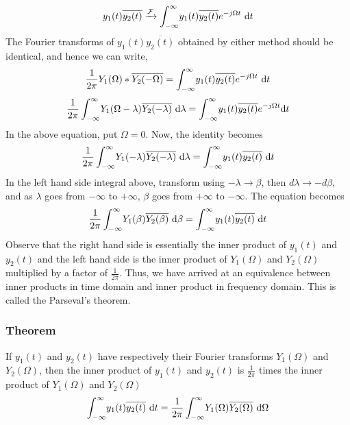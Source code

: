 		\begin{equation*}
			y_1(t)\overline{y_2(t)} \xrightarrow{\mathcal{F}} \int_{-\infty}^{\infty} \! y_1(t) \overline{y_2(t)} e^{-j\Omega t} \ \mathrm{d} t
		\end{equation*}
		The Fourier transforms of $y_1(t)\overline{y_2(t)}$  obtained by either method should be identical, and hence we can write,
		\begin{equation*}
			\frac{1}{2\pi} Y_1(\Omega) \ast \overline{Y_2(-\Omega)} = \int_{-\infty}^{\infty} \! y_1(t)\overline{y_2(t)} e^{-j\Omega t} \ \mathrm{d} t
		\end{equation*}
		\begin{equation*}
			\frac{1}{2\pi} \int_{-\infty}^{\infty} \! Y_1(\Omega - \lambda)\overline{Y_2(-\lambda)} \ \mathrm{d} \lambda 
			= 
			\int_{-\infty}^{\infty} \! y_1(t)\overline{y_2(t)} e^{-j\Omega t} \mathrm{d} t
		\end{equation*}
		In the above equation, put $\Omega  =0$. Now, the identity becomes
		\begin{equation*}
			\frac{1}{2\pi} \int_{-\infty}^{\infty} \! Y_1(-\lambda)\overline{Y_2(-\lambda)} \ \mathrm{d} \lambda
			= 
			\int_{-\infty}^{\infty} \! y_1(t)\overline{y_2(t)} \ \mathrm{d} t
		\end{equation*}
		In the left hand side integral above, transform using $-\lambda \rightarrow \beta$, then
		$d\lambda \rightarrow -d\beta$, and as $\lambda$ goes from $-\infty$ to $+\infty$, $\beta$ goes from $+\infty$ to $-\infty$. 
		The equation becomes
		\begin{equation*}
			\frac{1}{2\pi} \int_{-\infty}^{\infty} \!  Y_1(\beta) \overline{Y_2(\beta)} \ \mathrm{d} \beta 
			=
			\int_{-\infty}^{\infty} \! y_1(t) \overline{y_2(t)} \ \mathrm{d} t 
		\end{equation*}
		Observe that the right hand side is essentially the inner product of $y_1(t)$ and $y_2(t)$  and the left hand side is the inner product of $Y_1(\Omega)$ and   $Y_2(\Omega)$ multiplied by a factor of $\frac{1}{2\pi}$.  Thus, we have arrived at an equivalence between inner products in time domain and inner product in frequency domain. This is called the Parseval's theorem. 
	\subsubsection*{Theorem}
		If $y_1(t)$ and $y_2(t)$ have respectively their Fourier transforms $Y_1(\Omega)$ and $Y_2(\Omega)$, then the inner product of $y_1(t)$ and $y_2(t)$ is $\frac{1}{2\pi}$ times the inner product of $Y_1(\Omega)$ and $Y_2(\Omega)$
		\begin{equation*}
			\int_{-\infty}^{\infty} \! y_1(t) \overline{y_2(t)} \ \mathrm{d} t 
			=
			\frac{1}{2\pi} \int_{-\infty}^{\infty} \! Y_1(\Omega) \overline{Y_2(\Omega)} \ \mathrm{d} \Omega
		\end{equation*}









                



                     
